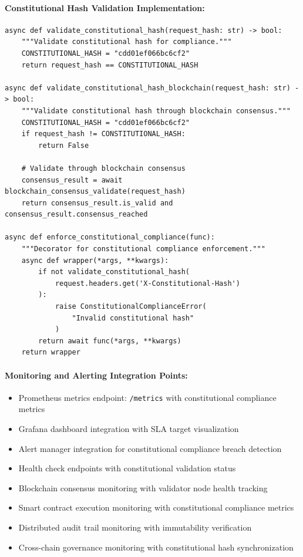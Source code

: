 \documentclass[manuscript,screen,9pt]{acmart}
\begin{document}
\paragraph{Constitutional Hash Validation Implementation:}
\begin{verbatim}
async def validate_constitutional_hash(request_hash: str) -> bool:
    """Validate constitutional hash for compliance."""
    CONSTITUTIONAL_HASH = "cdd01ef066bc6cf2"
    return request_hash == CONSTITUTIONAL_HASH

async def validate_constitutional_hash_blockchain(request_hash: str) -> bool:
    """Validate constitutional hash through blockchain consensus."""
    CONSTITUTIONAL_HASH = "cdd01ef066bc6cf2"
    if request_hash != CONSTITUTIONAL_HASH:
        return False

    # Validate through blockchain consensus
    consensus_result = await blockchain_consensus_validate(request_hash)
    return consensus_result.is_valid and consensus_result.consensus_reached

async def enforce_constitutional_compliance(func):
    """Decorator for constitutional compliance enforcement."""
    async def wrapper(*args, **kwargs):
        if not validate_constitutional_hash(
            request.headers.get('X-Constitutional-Hash')
        ):
            raise ConstitutionalComplianceError(
                "Invalid constitutional hash"
            )
        return await func(*args, **kwargs)
    return wrapper
\end{verbatim}

\paragraph{Monitoring and Alerting Integration Points:}
\begin{itemize}[itemsep=1pt,parsep=1pt]
    \item Prometheus metrics endpoint: \texttt{/metrics} with constitutional compliance metrics
    \item Grafana dashboard integration with SLA target visualization
    \item Alert manager integration for constitutional compliance breach detection
    \item Health check endpoints with constitutional validation status
    \item Blockchain consensus monitoring with validator node health tracking
    \item Smart contract execution monitoring with constitutional compliance metrics
    \item Distributed audit trail monitoring with immutability verification
    \item Cross-chain governance monitoring with constitutional hash synchronization
\end{itemize}
\end{document}
